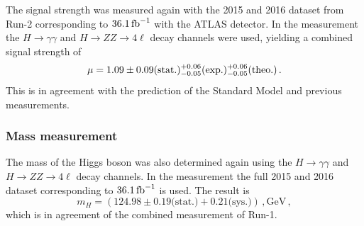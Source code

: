 The signal strength was measured again with the 2015 and 2016 dataset from Run-2 corresponding to $\SI{36.1}{\invfb}$ with the ATLAS detector.
In the measurement the $H\to\gamma\gamma$ and $H \to ZZ \to 4\ell$ decay channels were used,
yielding a combined signal strength of~\cite{ATLAS-CONF-2017-047}
\begin{equation}
    \mu = 1.09 \pm 0.09 \text{(stat.)} {}^{+{0.06}}_{-{0.05}} \text{(exp.)} {}^{+{0.06}}_{-{0.05}} \text{(theo.)} \,.
\end{equation}
This is in agreement with the prediction of the Standard Model and previous measurements.

\subsubsection{Mass measurement}\label{subsub:theory:meas:run2:mass}

The mass of the Higgs boson was also determined again using the $H\to\gamma\gamma$ and $H \to ZZ \to 4\ell$ decay channels.
In the measurement the full 2015 and 2016 dataset corresponding to $\SI{36.1}{\invfb}$ is used.
The result is~\cite{ATLAS-CONF-2017-046}
\begin{equation}
    m_H = (124.98 \pm 0.19 \text{(stat.)} + 0.21 \text{(sys.)}) \,, \text{GeV} \,,
\end{equation}
which is in agreement of the combined measurement of Run-1.
